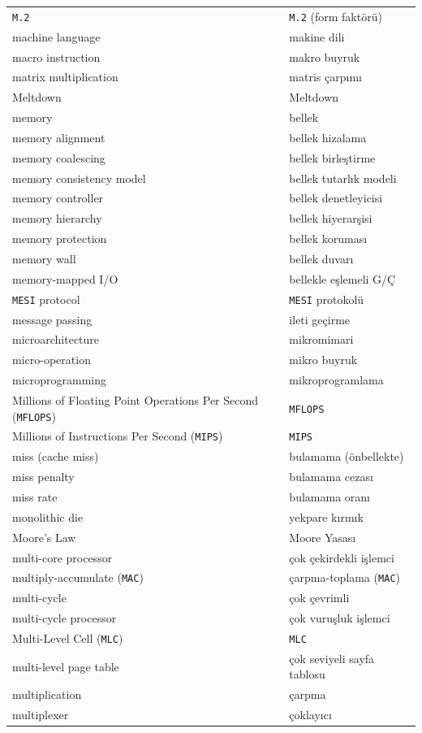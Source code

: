 {\begin{longtable}{@{}p{7.6cm}p{7.6cm}@{}}
\texttt{M.2} & \texttt{M.2} (form faktörü) \\
machine language & makine dili \\
macro instruction & makro buyruk \\
matrix multiplication & matris çarpımı \\
Meltdown & Meltdown \\
memory & bellek \\
memory alignment & bellek hizalama \\
memory coalescing & bellek birleştirme \\
memory consistency model & bellek tutarlık modeli \\
memory controller & bellek denetleyicisi \\
memory hierarchy & bellek hiyerarşisi \\
memory protection & bellek koruması \\
memory wall & bellek duvarı \\
memory-mapped I/O & bellekle eşlemeli G/Ç \\
\texttt{MESI} protocol & \texttt{MESI} protokolü \\
message passing & ileti geçirme \\
microarchitecture & mikromimari \\
micro-operation & mikro buyruk \\
microprogramming & mikroprogramlama \\
Millions of Floating Point Operations Per Second (\texttt{MFLOPS}) & \texttt{MFLOPS} \\
Millions of Instructions Per Second (\texttt{MIPS}) & \texttt{MIPS} \\
miss (cache miss) & bulamama (önbellekte) \\
miss penalty & bulamama cezası \\
miss rate & bulamama oranı \\
monolithic die & yekpare kırmık \\
Moore's Law & Moore Yasası \\
multi-core processor & çok çekirdekli işlemci \\
multiply-accumulate (\texttt{MAC}) & çarpma-toplama (\texttt{MAC}) \\
multi-cycle & çok çevrimli \\
multi-cycle processor & çok vuruşluk işlemci \\
Multi-Level Cell (\texttt{MLC}) & \texttt{MLC} \\
multi-level page table & çok seviyeli sayfa tablosu \\
multiplication & çarpma \\
multiplexer & çoklayıcı \\


\end{longtable}}
